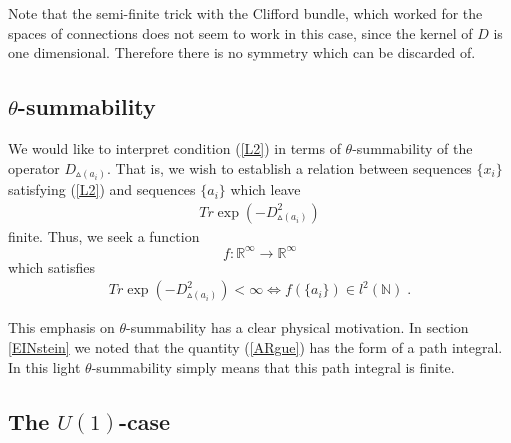 \documentclass[12pt]{article}
\newcommand{\ba}{\begin{eqnarray}}
\newcommand{\ea}{\end{eqnarray}}
\def\ch{{\cal H}}
\begin{document}
Note that the semi-finite trick with the Clifford bundle, which worked for the spaces of connections does not seem to work in this case, since the kernel of $D$ is one dimensional. Therefore there is no symmetry which can be discarded of.












\subsection{$\theta$-summability}

We would like to interpret condition (\ref{L2}) in terms of $\theta$-summability of the operator $D_{\smalltriangleup(a_i)}$. That is, we wish to establish a relation between sequences $\{x_i\}$ satisfying (\ref{L2}) and sequences $\{a_i\}$ which leave
\ba 
Tr\exp\left( -D_{\smalltriangleup(a_i)}^2 \right)
\label{ARgue}
\ea
finite.
Thus, we seek a function 
\[
f:\mathbb{R}^\infty\rightarrow \mathbb{R}^\infty
\]
which satisfies
\ba 
Tr\exp\left( -D_{\smalltriangleup(a_i)}^2 \right)<\infty \Leftrightarrow f(\{a_i\})\in l^2(\mathbb{N})\;.
\label{JJJ}
\ea


This emphasis on $\theta$-summability has a clear physical motivation. In section \ref{EINstein} we noted that the quantity (\ref{ARgue}) has the form of a path integral. In this light $\theta$-summability simply means that this path integral is finite.









\subsection{The $U(1)$-case}
\end{document}
